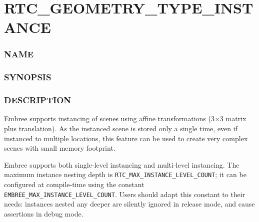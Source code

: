 \pagebreak

\section{RTC\_GEOMETRY\_TYPE\_INSTANCE}\label{rtc_geometry_type_instance}

\subsubsection{NAME}\label{name}

\begin{Shaded}
\begin{Highlighting}[]
\OperatorTok{{-}}
\end{Highlighting}
\end{Shaded}

\subsubsection{SYNOPSIS}\label{synopsis}

\begin{Shaded}
\begin{Highlighting}[]

\OperatorTok{=}
\OperatorTok{(}\OperatorTok{,}\OperatorTok{);}
\end{Highlighting}
\end{Shaded}

\subsubsection{DESCRIPTION}\label{description}

Embree supports instancing of scenes using affine transformations (3×3
matrix plus translation). As the instanced scene is stored only a single
time, even if instanced to multiple locations, this feature can be used
to create very complex scenes with small memory footprint.

Embree supports both single-level instancing and multi-level instancing.
The maximum instance nesting depth is
\texttt{RTC\_MAX\_INSTANCE\_LEVEL\_COUNT}; it can be configured at
compile-time using the constant
\texttt{EMBREE\_MAX\_INSTANCE\_LEVEL\_COUNT}. Users should adapt this
constant to their needs: instances nested any deeper are silently
ignored in release mode, and cause assertions in debug mode.

